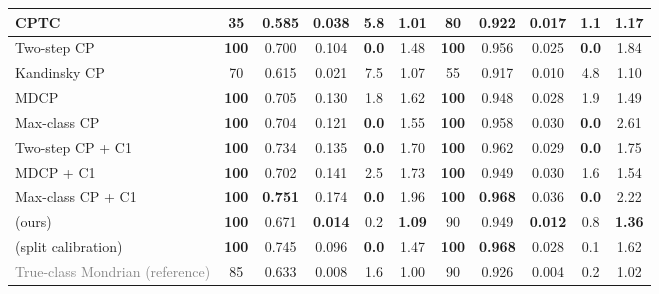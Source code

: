 \begin{table}[t]
{\begin{tabular}{lccccc@{\hspace{12pt}}ccccc}
CPTC & 35 & 0.585 & 0.038 & 5.8 & 1.01 & 80 & 0.922 & 0.017 & 1.1 & 1.17 \\
\midrule
Two-step CP & \textbf{100} & 0.700 & 0.104 & \textbf{0.0} & 1.48 & \textbf{100} & 0.956 & 0.025 & \textbf{0.0} & 1.84 \\
Kandinsky CP & 70 & 0.615 & 0.021 & 7.5 & 1.07 & 55 & 0.917 & 0.010 & 4.8 & 1.10 \\
MDCP & \textbf{100} & 0.705 & 0.130 & 1.8 & 1.62 & \textbf{100} & 0.948 & 0.028 & 1.9 & 1.49 \\
Max-class CP & \textbf{100} & 0.704 & 0.121 & \textbf{0.0} & 1.55 & \textbf{100} & 0.958 & 0.030 & \textbf{0.0} & 2.61 \\
\midrule
Two-step CP + C1 & \textbf{100} & 0.734 & 0.135 & \textbf{0.0} & 1.70 & \textbf{100} & 0.962 & 0.029 & \textbf{0.0} & 1.75 \\
MDCP + C1 & \textbf{100} & 0.702 & 0.141 & 2.5 & 1.73 & \textbf{100} & 0.949 & 0.030 & 1.6 & 1.54 \\
Max-class CP + C1 & \textbf{100} & \textbf{0.751} & 0.174 & \textbf{0.0} & 1.96 & \textbf{100} & \textbf{0.968} & 0.036 & \textbf{0.0} & 2.22 \\
\midrule
\rowcolor{gray!12}\gamut{} (ours) & \textbf{100} & 0.671 & \textbf{0.014} & 0.2 & \textbf{1.09} & 90 & 0.949 & \textbf{0.012} & 0.8 & \textbf{1.36} \\
\gamut{} (split calibration) & \textbf{100} & 0.745 & 0.096 & \textbf{0.0} & 1.47 & \textbf{100} & \textbf{0.968} & 0.028 & 0.1 & 1.62 \\
\textcolor{gray}{True-class Mondrian (reference)} & 85 & 0.633 & 0.008 & 1.6 & 1.00 & 90 & 0.926 & 0.004 & 0.2 & 1.02 \\
\bottomrule
\end{tabular}}
\end{table}
